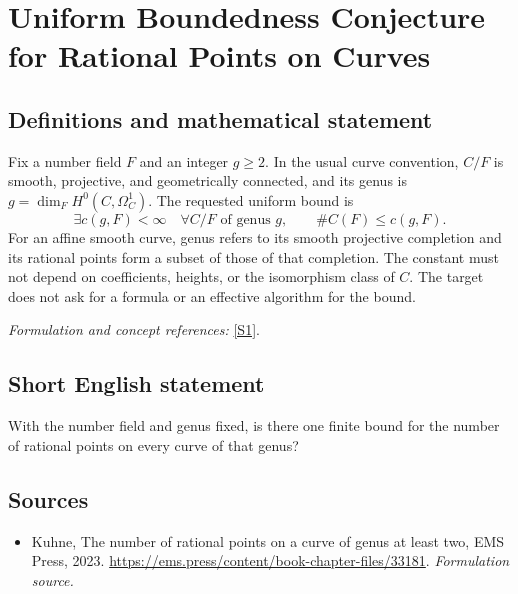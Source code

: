 \documentclass[11pt]{article}
\begin{document}
\section*{\texorpdfstring{Uniform Boundedness Conjecture for Rational Points on Curves}{Uniform Boundedness Conjecture for Rational Points on Curves}}\label{30006763}
\subsection{Definitions and mathematical statement}
Fix a number field $F$ and an integer $g\ge2$. In the usual curve convention, $C/F$ is smooth, projective, and geometrically connected, and its genus is $g=\dim_F H^0(C,\Omega_C^1)$. The requested uniform bound is
\[
 \exists c(g,F)<\infty\quad\forall C/F\text{ of genus }g,
 \qquad\#C(F)\le c(g,F).
\]
For an affine smooth curve, genus refers to its smooth projective completion and its rational points form a subset of those of that completion. The constant must not depend on coefficients, heights, or the isomorphism class of $C$. The target does not ask for a formula or an effective algorithm for the bound.
\par\smallskip\textit{Formulation and concept references:} \href{https://ems.press/content/book-chapter-files/33181}{[S1]}.

\subsection{Short English statement}
With the number field and genus fixed, is there one finite bound for the number of rational points on every curve of that genus?
\subsection{Sources}
\begin{itemize}
\item[S1]Kuhne, The number of rational points on a curve of genus at least two, EMS Press, 2023.
\url{https://ems.press/content/book-chapter-files/33181}.
\textit{Formulation source.}
\end{itemize}
\end{document}
